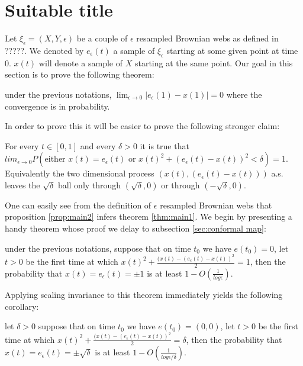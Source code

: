 {
\section{Suitable title}
Let $\xi_\epsilon=(X,Y,\epsilon)$ be a couple of $\epsilon$ resampled Brownian webs as defined in ?????. We denoted by $e_\epsilon(t)$ a sample of $\xi_\epsilon$ starting at some given point at time $0$. $x(t)$ will denote a sample of $X$ starting at the same point. Our goal in this section is to prove the following theorem:

\begin{theorem}\label{thm:main1}
under the previous notations, $\lim_{\epsilon \rightarrow 0} |e_\epsilon(1)- x(1)| = 0$ where the convergence is in probability.
\end{theorem}

In order to prove this it will be easier to prove the following stronger claim:
\begin{propos}\label{prop:main2}
For every $t\in[0,1]$ and every $\delta>0$ it is true that $lim_{\epsilon \rightarrow 0}P\left(\text{either } x(t)=e_\epsilon(t) \text{ or } x(t)^2+(e_\epsilon(t)-x(t))^2<\delta\right)=1$. Equivalently the two dimensional process 
$(x(t),(e_\epsilon(t)-x(t)))$ a.s. leaves the $\sqrt\delta$ ball only through $(\sqrt\delta,0)$ or through $(-\sqrt\delta,0)$.
\end{propos}

One can easily see from the definition of $\epsilon$ resampled Brownian webs that proposition \ref{prop:main2} infers theorem \ref{thm:main1}.
We begin by presenting a handy theorem whose proof we delay to subsection \ref{sec:conformal map}:

\begin{theorem}\label{thm:no-escape}
under the previous notations, suppose that on time $t_0$ we have $e(t_0)=0$, let $t>0$ be the first time at which $x(t)^2+\frac{(x(t)-(e_\epsilon(t)-x(t))^2}2=1$, then the probability that $x(t)=e_\epsilon(t)=\pm1$ is at least $1-O(\frac1{log\epsilon})$.
\end{theorem}

Applying scaling invariance to this theorem immediately yields the following corollary:
\begin{cor}\label{cor:cor0}
let $\delta>0$ suppose that on time $t_0$ we have $e(t_0)=(0,0)$, let $t>0$ be the first time at which $x(t)^2+\frac{(x(t)-(e_\epsilon(t)-x(t))^2}2=\delta$, then the probability that $x(t)=e_\epsilon(t)=\pm\sqrt\delta$ is at least $1-O(\frac{1}{log\epsilon/\delta})$.
\end{cor}

}
